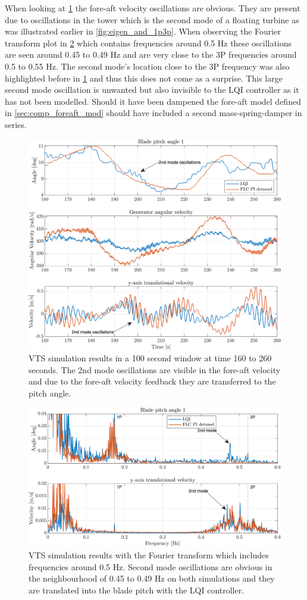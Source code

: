 When looking at \cref{fig:vts_12_zoom_th_w_py_vy} the fore-aft velocity oscillations are obvious. They are present due to oscillations in the tower which is the second mode of a floating turbine as was illustrated earlier in \cref{fig:eigen_and_1p3p}. When observing the Fourier transform plot in \cref{fig:vts_13_zoom_fft_th_w_py_vy} which contains frequencies around 0.5 Hz these oscillations are seen around 0.45 to 0.49 Hz and are very close to the 3P frequencies around 0.5 to 0.55 Hz. The second mode's location close to the 3P frequency was also highlighted before in \cref{fig:vts_12_zoom_th_w_py_vy} and thus this does not come as a surprise. This large second mode oscillation is unwanted but also invisible to the LQI controller as it has not been modelled. Should it have been dampened the fore-aft model defined in \cref{sec:comp_foreaft_mod} should have included a second mass-spring-damper in series.
\begin{figure}[ht]
	\centering
	\includegraphics[width=0.7\linewidth]{Graphics/TestResults/VTSplotting/12_zoom_th_w_vy.png}
	\caption{VTS simulation results in a 100 second window at time 160 to 260 seconds. The 2nd mode oscillations are visible in the fore-aft velocity and due to the fore-aft velocity feedback they are transferred to the pitch angle.}
	\label{fig:vts_12_zoom_th_w_py_vy}
\end{figure}
\begin{figure}[ht]
	\centering
	\includegraphics[width=0.7\linewidth]{Graphics/TestResults/VTSplotting/13_zoom_fft_th_vy.png}
	\caption{VTS simulation results with the Fourier transform which includes frequencies around 0.5 Hz. Second mode oscillations are obvious in the neighbourhood of 0.45 to 0.49 Hz on both simulations and they are translated into the blade pitch with the LQI controller.}
	\label{fig:vts_13_zoom_fft_th_w_py_vy}
\end{figure}

